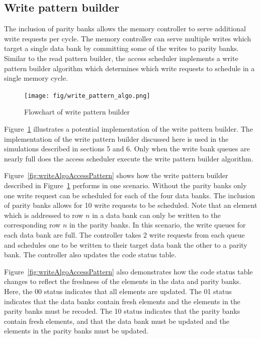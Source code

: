 \subsection{Write pattern builder}
\label{sec:writeCodingAlgo}
The inclusion of parity banks allows the memory controller to serve additional write requests per cycle. The memory controller can serve multiple writes which target a single data bank by committing some of the writes to parity banks. Similar to the read pattern builder, the access scheduler implements a write pattern builder algorithm which determines which write requests to schedule in a single memory cycle. 

\begin{figure}[htbp]
\centering
	\texttt{[image: fig/write\_pattern\_algo.png]}
	\caption{{ Flowchart of write pattern builder}}
	\label{fig:writeFlow}
\end{figure}

Figure~\ref{fig:writeFlow} illustrates a potential implementation of the write pattern builder. The implementation of the write pattern builder discussed here is used in the simulations described in sections 5 and 6. Only when the write bank queues are nearly full does the access scheduler execute the write pattern builder algorithm. 

Figure~\ref{fig:writeAlgoAccessPattern} shows how the write pattern builder described in Figure~\ref{fig:writeFlow} performs in one scenario. Without the parity banks only one write request can be scheduled for each of the four data banks. The inclusion of parity banks allows for 10 write requests to be scheduled. Note that an element which is addressed to row $n$ in a data bank can only be written to the corresponding row $n$ in the parity banks. In this scenario, the write queues for each data bank are full. The controller takes $2$ write requests from each queue and schedules one to be written to their target data bank the other to a parity bank. The controller also updates the code status table. 

{\color{red}
Figure~\ref{fig:writeAlgoAccessPattern} also demonstrates how the code status table changes to reflect the freshness of the elements in the data and parity banks. Here, the 00 status indicates that all elements are updated. The 01 status indicates that the data banks contain fresh elements and the elements in the parity banks must be recoded. The 10 status indicates that the parity banks contain fresh elements, and that the data bank must be updated and the elements in the parity banks must be updated.
}

